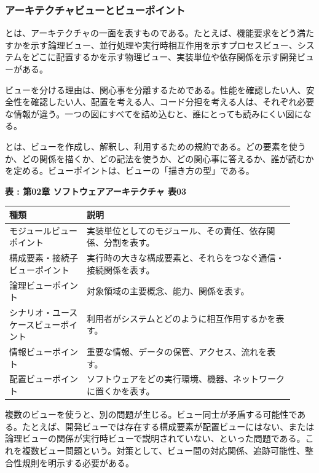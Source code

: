 \subsubsection{アーキテクチャビューとビューポイント}
とは、アーキテクチャの一面を表すものである。たとえば、機能要求をどう満たすかを示す論理ビュー、並行処理や実行時相互作用を示すプロセスビュー、システムをどこに配置するかを示す物理ビュー、実装単位や依存関係を示す開発ビューがある。

ビューを分ける理由は、関心事を分離するためである。性能を確認したい人、安全性を確認したい人、配置を考える人、コード分担を考える人は、それぞれ必要な情報が違う。一つの図にすべてを詰め込むと、誰にとっても読みにくい図になる。

とは、ビューを作成し、解釈し、利用するための規約である。どの要素を使うか、どの関係を描くか、どの記法を使うか、どの関心事に答えるか、誰が読むかを定める。ビューポイントは、ビューの「描き方の型」である。

\par\smallskip\noindent{}\label{tab:ch02-03}\textbf{表 \thetable: 第02章 ソフトウェアアーキテクチャ 表03}\par\smallskip
\begin{longtable}{P{0.25\linewidth}P{0.67\linewidth}}
\toprule
種類 & 説明 \\
\midrule
モジュールビューポイント & 実装単位としてのモジュール、その責任、依存関係、分割を表す。 \\
構成要素・接続子ビューポイント & 実行時の大きな構成要素と、それらをつなぐ通信・接続関係を表す。 \\
論理ビューポイント & 対象領域の主要概念、能力、関係を表す。 \\
シナリオ・ユースケースビューポイント & 利用者がシステムとどのように相互作用するかを表す。 \\
情報ビューポイント & 重要な情報、データの保管、アクセス、流れを表す。 \\
配置ビューポイント & ソフトウェアをどの実行環境、機器、ネットワークに置くかを表す。 \\
\bottomrule
\end{longtable}

複数のビューを使うと、別の問題が生じる。ビュー同士が矛盾する可能性である。たとえば、開発ビューでは存在する構成要素が配置ビューにはない、または論理ビューの関係が実行時ビューで説明されていない、といった問題である。これを複数ビュー問題という。対策として、ビュー間の対応関係、追跡可能性、整合性規則を明示する必要がある。

